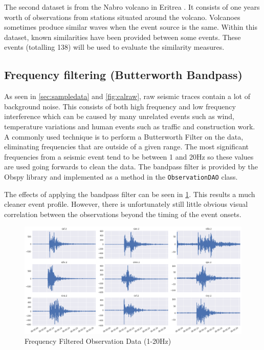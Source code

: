 \documentclass[../report.tex]{subfiles}
\begin{document}
	The second dataset is from the Nabro volcano in Eritrea \citep{eritrea1}.  It consists of one years worth of observations from stations situated around the volcano.  Volcanoes sometimes produce similar waves when the event source is the same.  Within this dataset, known similarities have been provided between some events.  These events (totalling 138) will be used to evaluate the similarity measures.

\subsection{Frequency filtering (Butterworth Bandpass)}
	As seen in \cref{sec:sampledata} and \cref{fig:calraw}, raw seismic traces contain a lot of background noise.  This consists of both high frequency and low frequency interference which can be caused by many unrelated events such as wind, temperature variations and human events such as traffic and construction work.  A commonly used technique is to perform a Butterworth Filter \citep{bandpass} on the data, eliminating frequencies that are outside of a given range.  The most significant frequencies from a seismic event tend to be between 1 and 20Hz so these values are used going forwards to clean the data.  The bandpass filter is provided by the Obspy library and implemented as a method in the \texttt{ObservationDAO} class.
	
	The effects of applying the bandpass filter can be seen in \cref{fig:calbandpass}.  This results a much cleaner event profile.  However, there is unfortunately still little obvious visual correlation between the observations beyond the timing of the event onsets.

\begin{figure}[H]
	\centering
	\includegraphics[width=1\linewidth]{img/cal_bandpass}
	\caption{Frequency Filtered Observation Data (1-20Hz)}
	\label{fig:calbandpass}
\end{figure}
\end{document}
